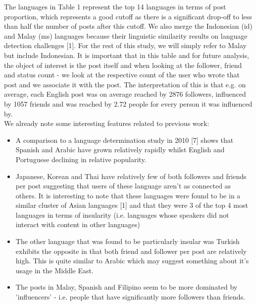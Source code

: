 \documentclass[12pt]{article}
\begin{document}
\FloatBarrier
The languages in Table 1 represent the top 14 languages in terms of post proportion, which represents a good cutoff as there is a significant drop-off to less than half the number of posts after this cutoff. We also merge the Indonesian (id) and Malay (ms) languages because their linguistic similarity results on language detection challenges [1]. For the rest of this study, we will simply refer to Malay but include Indonesian. It is important that in this table and for future analysis, the object of interest is the post itself and when looking at the follower, friend and status count - we look at the respective count of the user who wrote that post and we associate it with the post. The interpretation of this is that e.g. on average, each English post was on average reached by 2876 followers, influenced by 1057 friends and was reached by 2.72 people for every person it was influenced by.\\
We already note some interesting features related to previous work:
\begin{itemize}
\item A comparison to a language determination study in 2010 [7] shows that Spanish and Arabic have grown relatively rapidly whilst English and Portuguese declining in relative popularity.
\item Japanese, Korean and Thai have relatively few of both followers and friends per post suggesting that users of these language aren't as connected as others. It is interesting to note that these languages were found to be in a similar cluster of Asian languages [1] and that they were 3 of the top 4 most languages in terms of insularity (i.e. languages whose speakers did not interact with content in other languages)
\item The other language that was found to be particularly insular was Turkish exhibits the opposite in that both friend and follower per post are relatively high. This is quite similar to Arabic which may suggest something about it's usage in the Middle East.
\item The posts in Malay, Spanish and Filipino seem to be more dominated by 'influencers' - i.e. people that have significantly more followers than friends.
\end{itemize}
\end{document}
